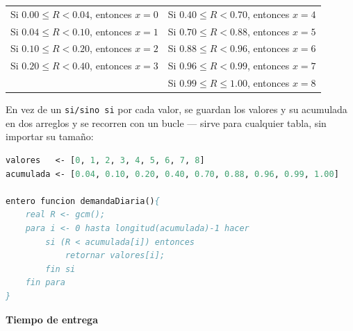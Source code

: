 \begin{description}
    \begin{center}
    \begin{tabular}{ll}
    Si $0.00 \leq R < 0.04$, entonces $x=0$ & Si $0.40 \leq R < 0.70$, entonces $x=4$ \\
    Si $0.04 \leq R < 0.10$, entonces $x=1$ & Si $0.70 \leq R < 0.88$, entonces $x=5$ \\
    Si $0.10 \leq R < 0.20$, entonces $x=2$ & Si $0.88 \leq R < 0.96$, entonces $x=6$ \\
    Si $0.20 \leq R < 0.40$, entonces $x=3$ & Si $0.96 \leq R < 0.99$, entonces $x=7$ \\
                                            & Si $0.99 \leq R \leq 1.00$, entonces $x=8$ \\
    \end{tabular}
    \end{center}

    \item[Paso 5: Propuesta algorítmica para la variable aleatoria]

    En vez de un \texttt{si/sino si} por cada valor, se guardan los valores y su acumulada en dos arreglos y se recorren con un bucle — sirve para cualquier tabla, sin importar su tamaño:

    \begin{lstlisting}[caption={demandaDiaria()}, language=Pascal]
valores   <- [0, 1, 2, 3, 4, 5, 6, 7, 8]
acumulada <- [0.04, 0.10, 0.20, 0.40, 0.70, 0.88, 0.96, 0.99, 1.00]

entero funcion demandaDiaria(){
    real R <- gcm();
    para i <- 0 hasta longitud(acumulada)-1 hacer
        si (R < acumulada[i]) entonces
            retornar valores[i];
        fin si
    fin para
}
    \end{lstlisting}
\end{description}

\textbf{Tiempo de entrega}

